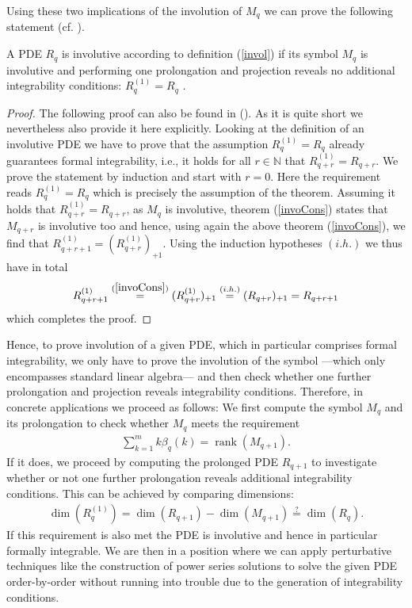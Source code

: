 Using these two implications of the involution of $M_q$ we can prove the following statement (cf. \cite{seiler1994analysis}).
\begin{theorem}
A PDE $R_q$ is involutive according to definition (\ref{invol}) if its symbol $M_q$ is involutive and performing one prolongation and projection reveals no additional integrability conditions: $R_q^{(1)} = R_q$ .
\end{theorem}
\begin{proof}
The following proof can also be found in (\cite{seiler1994analysis}). As it is quite short we nevertheless also provide it here explicitly.
Looking at the definition of an involutive PDE we have to prove that the assumption $R_q^{(1)} = R_q$ already guarantees formal integrability, i.e., it holds for all $r \in \mathbb{N}$ that $R_{q+r}^{(1)} = R_{q+r}$. We prove the statement by induction and start with $r=0$. Here the requirement reads $R_q^{(1)}=R_q$ which is precisely the assumption of the theorem. Assuming it holds that $R_{q+r}^{(1)}=R_{q+r}$, as $M_q$ is involutive, theorem (\ref{invoCons}) states that $M_{q+r}$ is involutive too and hence, using again the above theorem (\ref{invoCons}), we find that $R_{q+r+1}^{(1)}= (R_{q+r}^{(1)})_{+1}$. Using the induction hypotheses $(i.h.)$ we thus have in total
\begin{align}
   R_{q+r+1}^{(1)} \overset{(\ref{invoCons})}{=} (R_{q+r}^{(1)})_{+1} \overset{(i.h.)}{=} (R_{q+r})_{+1} = R_{q+r+1} 
\end{align}
which completes the proof. 
\end{proof}
Hence, to prove involution of a given PDE, which in  particular comprises formal integrability, we only have to prove the involution of the symbol ---which only encompasses standard linear algebra--- and then check whether one further prolongation and projection reveals integrability conditions. Therefore, in concrete applications we proceed as follows: We first compute the symbol $M_q$ and its prolongation to check whether $M_q$ meets the requirement
\begin{align}
        \sum_{k=1}^m k\beta_q(k) = \operatorname{rank}(M_{q+1}).
\end{align}
If it does, we proceed by computing the prolonged PDE $R_{q+1}$ to investigate whether or not one further prolongation reveals additional integrability conditions. This can be achieved by comparing dimensions:
\begin{align}\label{dims}
    \operatorname{dim}(R_q^{(1)}) = \operatorname{dim}(R_{q+1}) - \operatorname{dim}(M_{q+1}) \stackrel{?}{=} \operatorname{dim}(R_q).
\end{align}
If this requirement is also met the PDE is involutive and hence in particular formally integrable. We are then in a position where we can apply perturbative techniques like the construction of power series solutions to solve the given PDE order-by-order without running into trouble due to the generation of integrability conditions.

